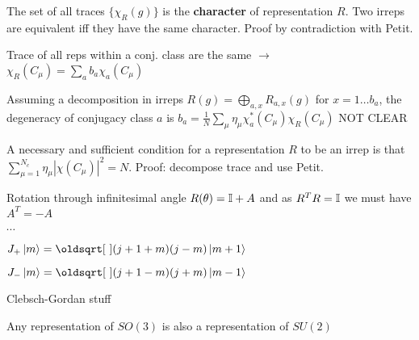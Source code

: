 \begin{squishlist}
    \item The set of all traces $\{\chi_R(g)\}$ is the \textbf{character} of representation $R$. Two irreps are equivalent iff they have the same character.
    Proof by contradiction with Petit.

    \item Trace of all reps within a conj. class are the same $\rightarrow$ $\chi_R(C_{\mu}) = \sum_a b_a \chi_a ( C_{\mu})$
    \item Assuming a decomposition in irreps $R(g) = \bigoplus_{a,x}R_{a,x}(g)$ for $x = 1 \ldots b_a$, the degeneracy of conjugacy class $a$ is $b_a = \frac{1}{N} \sum_{\mu} \eta_{\mu} \chi^*_a(C_{\mu})\chi_R(C_{\mu})$ NOT CLEAR
    
    \item A necessary and sufficient condition for a representation $R$ to be an irrep is that \\
    $\sum_{\mu = 1}^{N_c} \eta_{\mu} |\chi(C_{\mu})|^2 = N$. Proof: decompose trace and use Petit.
\end{squishlist}


\begin{squishlist}
    \item Rotation through infinitesimal angle $R(\theta) = \mathbb{I} + A$ and as $R^T R = \mathbb{I}$ we must have $A^T = -A$
    \item $\cdots$
\end{squishlist}

\begin{squishlist}
    \item $J_+ \ket{m} = \sqrt{(j + 1 + m) (j-m)} \ket{m + 1}$
    \item $J_- \ket{m} = \sqrt{(j+1 - m) (j+m)} \ket{m-1}$
    \item Clebsch-Gordan stuff
    \item Any representation of $SO(3)$ is also a representation of $SU(2)$
\end{squishlist}

